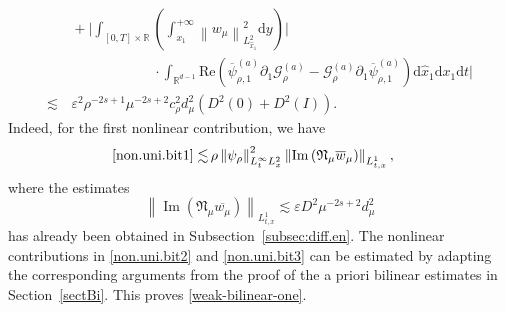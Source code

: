 \documentclass[11pt,letterpaper,reqno]{amsart}
\numberwithin{equation}{section}
\theoremstyle{definition}
\theoremstyle{remark}
\begin{document}
\begin{align}
	&\,+\Big|\int_{[0,T]\times \mathbb{R}}  \left( \int^{+\infty}_{x_1}   \left\|w_\mu\right\|^2_{L^2_{\widehat{x}_1}}   \mathrm{ d} y\right) 
 \Big|\label{non.uni.bit3}\\
	&\qquad\qquad\qquad  \cdot \int_{\mathbb{R}^{d-1}} \mathrm{Re} \left(\overline{\psi}_{\rho,1}^{(a)} \partial_{1} \mathcal{G}_\rho^{(a)} - \mathcal{G}_\rho^{(a)} \partial_{1} \overline{\psi}_{\rho,1}^{(a)}\right)   \mathrm{d} \widehat{x}_1 \mathrm{ d} x_1 \mathrm{ d} t \Big| \nonumber\\
    \lesssim&\, \varepsilon^2 \rho^{-2s+1} \mu^{-2s+2} c_\rho^2 d_\mu^2 ( D^2(0)+ D^2(I)).\nonumber
\end{align}
Indeed, for the first nonlinear contribution, we have
\begin{align*}
    \eqref{non.uni.bit1} \lesssim  &\, \rho \left\|\psi_{\rho } \right\|_{L^\infty_t L^2_x }^2  \left\|\mathrm{Im} \left(  \mathfrak{N}_\mu \overline{ w}_\mu\right) \right\|_{L^1_{t,x}},
\end{align*}
where the estimates
\[
\left\|
\operatorname{Im}
\left(
\mathfrak N_\mu\overline{w_\mu}
\right)
\right\|_{L_{t,x}^1} \lesssim \varepsilon  D^2 \mu^{-2s+2} d_\mu^2
\]
has already been obtained in Subsection~\ref{subsec:diff.en}. The
nonlinear contributions in \eqref{non.uni.bit2} and
\eqref{non.uni.bit3} can be estimated by adapting the corresponding
arguments from the proof of the a priori bilinear estimates in
Section~\ref{sectBi}. This proves \eqref{weak-bilinear-one}. 
\end{document}

